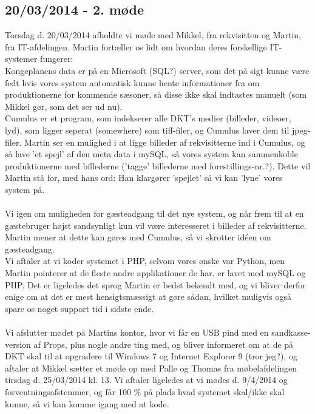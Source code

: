 \documentclass[12pt]{article}
\begin{document}
\subsection*{20/03/2014 - 2. møde}
Torsdag d. 20/03/2014 afholdte vi møde med Mikkel, fra rekvisitten og Martin, fra IT-afdelingen. Martin fortæller os lidt om hvordan deres forskellige IT-systemer fungerer: \\ Kongeplanens data er på en Microsoft (SQL?) server, som det på sigt kunne være fedt hvis vores system automatisk kunne hente informationer fra om produktionerne for kommende sæsoner, så disse ikke skal indtastes manuelt (som Mikkel gør, som det ser ud nu).
\\
Cumulus er et program, som indekserer alle DKT's medier (billeder, videoer, lyd), som ligger seperat (somewhere) som tiff-filer, og Cumulus laver dem til jpeg-filer. Martin ser en mulighed i at ligge billeder af rekvisitterne ind i Cumulus, og så lave 'et spejl' af den meta data i mySQL, så vores system kan sammenkoble produktionerne med billederne ('tagge' billederne med forestillings-nr.?). Dette vil Martin stå for, med hans ord: Han klargører 'spejlet' så vi kan 'lyne' vores system på. \\\\
Vi igen om muligheden for gæsteadgang til det nye system, og når frem til at en gæstebruger højst sandsynligt kun vil være interesseret i billeder af rekvisitterne. Martin mener at dette kan gøres med Cumulus, så vi skrotter idéen om gæsteadgang. \\
Vi aftaler at vi koder systemet i PHP, selvom vores ønske var Python, men Martin pointerer at de fleste andre applikationer de har, er lavet med mySQL og PHP. Det er ligeledes det sprog Martin er bedst bekendt med, og vi bliver derfor enige om at det er mest hensigtsmæssigt at gøre sådan, hvilket muligvis også spare os noget support tid i sidste ende. \\\\
Vi afslutter mødet på Martins kontor, hvor vi får en USB pind med en sandkasse-version af Props, plus nogle andre ting med, og bliver informeret om at de på DKT skal til at opgradere til Windows 7 og Internet Explorer 9 (tror jeg?), og aftaler at Mikkel sætter et møde op med Palle og Thomas fra møbelafdelingen tirsdag d. 25/03/2014 kl. 13. Vi aftaler ligeledes at vi mødes d. 9/4/2014 og forventningsafstemmer, og får 100 \% på plads hvad systemet skal/ikke skal kunne, så vi kan komme igang med at kode.
\end{document}
